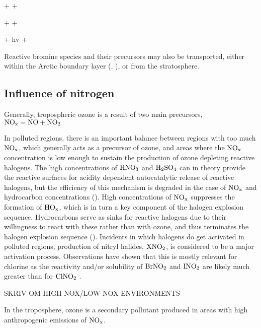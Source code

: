 \begin{reaction}
     +   + 
    \label{R:10}
\end{reaction} 
\begin{reaction}
     +   + 
    \label{R:11}
\end{reaction}
\begin{reaction}
     + hv  + 
    \label{R:12}
\end{reaction}

\medskip

Reactive bromine species and their precursors may also be transported, either within the Arctic boundary layer (\cite{Luo2018}, \cite{Schmidt}), or from the stratosphere. 


\subsection{Influence of nitrogen}\label{sec:influence_of_nitrogen}


Generally, tropospheric ozone is a result of two main precursors, $\mathrm{NO_x} = \mathrm{NO} + \mathrm{NO_2}$

In polluted regions, there is an important balance between regions with too much $\mathrm{NO_x}$, which generally acts as a precursor of ozone, and areas where the $\mathrm{NO_x}$ concentration is low enough to sustain the production of ozone depleting reactive halogens. The high concentrations of $\mathrm{HNO_3}$ and $\mathrm{H_2SO_4}$ can in theory provide the reactive surfaces for acidity dependent autocatalytic release of reactive halogens, but the efficiency of this mechanism is degraded in the case of $\mathrm{NO_x}$ and hydrocarbon concentrations (\cite{Simpson2015}). High concentrations of $\mathrm{NO_x}$ suppresses the formation of $\mathrm{HO_x}$, which is in turn a key component of the halogen explosion sequence. Hydrocarbons serve as sinks for reactive halogens due to their willingness to react with these rather than with ozone, and thus terminates the halogen explosion sequence (\cite{Simpson2015}). Incidents in which halogens do get activated in polluted regions, production of nitryl halides, $\mathrm{XNO_2}$, is considered to be a major activation process. Observations have shown that this is mostly relevant for chlorine as the reactivity and/or solubility of $\mathrm{BrNO_2}$ and $\mathrm{INO_2}$ are likely much greater than for $\mathrm{ClNO_2}$ \cite{Simpson2015}. 

\medskip





\cite{SeinfeldSpyros} SKRIV OM HIGH NOX/LOW NOX ENVIRONMENTS

In the troposphere, ozone is a secondary pollutant produced in areas with high anthropogenic emissions of $\mathrm{NO_x}$. 